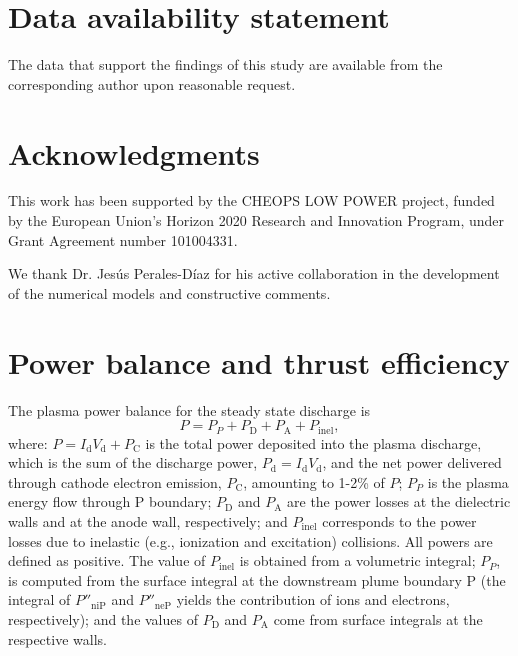 \documentclass[%
 aip,
cha,
 amsmath,amssymb,
 reprint,%
]{revtex4-1}
\begin{document}
\section*{Data availability statement}

The data that support the findings of this study are available
from the corresponding author upon reasonable request.


\section*{Acknowledgments}

This work has been supported by the CHEOPS LOW POWER project, funded by the European Union’s Horizon 2020 Research and Innovation Program, under Grant Agreement number 101004331.

We thank Dr. Jesús Perales-Díaz for his active collaboration in the development of the numerical models and constructive comments.


\appendix


\renewcommand{\theequation}{\thesection.\arabic{equation}}
\renewcommand\thefigure{\thesection.\arabic{figure}}  
\renewcommand\thetable{\thesection.\arabic{table}}  



\section{Power balance and thrust efficiency}
\label{sec: App balances}


The plasma power balance for the steady state discharge is
\begin{equation}
P = P_{P} + P_\mathrm{D} + P_\mathrm{A} + P_\mathrm{inel},
\label{eq: power_balance}
\end{equation}
where: $P = I_\mathrm{d} V_\mathrm{d} + P_\mathrm{C}$ is the total power deposited into the plasma discharge, which is the sum of the discharge power, $P_\mathrm{d} = I_\mathrm{d}V_\mathrm{d}$, and the net power delivered through cathode electron emission, $P_\mathrm{C}$, amounting to 1-2\% of $P$;
$P_{P}$ is the plasma energy flow through P boundary; $P_\mathrm{D}$ and $P_\mathrm{A}$ are the power losses at the dielectric walls and at the anode wall, respectively; and $P_\mathrm{inel}$ corresponds to the power losses due to inelastic (e.g., ionization and excitation) collisions. All powers are defined as positive. 
The value of $P_\mathrm{inel}$ is obtained from a volumetric integral; $P_{P}$, is computed from the surface integral at the downstream plume boundary P (the integral of $P''_\mathrm{niP}$ and $P''_\mathrm{neP}$ yields the contribution of ions and electrons, respectively); and the values of $P_\mathrm{D}$ and $P_\mathrm{A}$ come from surface integrals at the respective walls.
\end{document}
